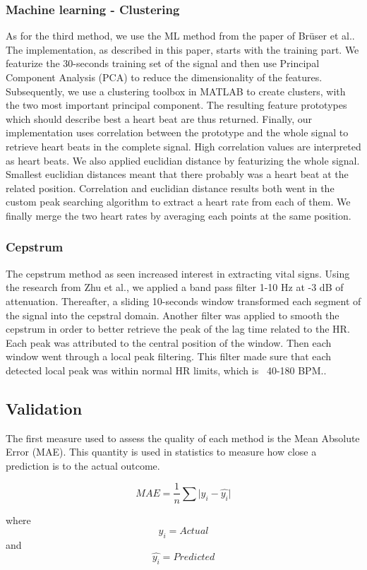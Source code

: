 \documentclass[twoside,twocolumn]{article}
\begin{document}
		\subsubsection{Machine learning - Clustering}
		As for the third method, we use the ML method from the paper of Brüser et al.\cite{bruser_adaptive_2011}. The implementation, as described in this paper, starts with the training part. We featurize the 30-seconds training set of the signal and then use Principal Component Analysis (PCA) to reduce the dimensionality of the features. Subsequently, we use a clustering toolbox in MATLAB to create clusters, with the two most important principal component. The resulting feature prototypes which should describe best a heart beat are thus returned. Finally, our implementation uses correlation between the prototype and the whole signal to retrieve heart beats in the complete signal. High correlation values are interpreted as heart beats. We also applied euclidian distance by featurizing the whole signal. Smallest euclidian distances meant that there probably was a heart beat at the related position. Correlation and euclidian distance results both went in the custom peak searching algorithm to extract a heart rate from each of them. We finally merge the two heart rates by averaging each points at the same position.
		\subsubsection{Cepstrum}
		The cepstrum method as seen increased interest in extracting vital signs. Using the research from Zhu et al.\cite{zhu_heart_2014}, we applied a band pass filter 1-10 Hz at -3 dB of attenuation. Thereafter, a sliding 10-seconds window transformed each segment of the signal into the cepstral domain. Another filter was applied to smooth the cepstrum in order to better retrieve the peak of the lag time related to the HR. Each peak was attributed to the central position of the window. Then each window went through a local peak filtering. This filter made sure that each detected local peak was within normal HR limits, which is ~40-180 BPM.\cite{zhu_heart_2014}.
	\subsection{Validation}
	\label{subsection:Methodology:Validation}
	The first measure used to assess the quality of each method is the Mean Absolute Error (MAE). This quantity is used in statistics to measure how close a prediction is to the actual outcome.
	\begin{center}
		\[MAE = \frac{1}{n}\sum\vert y_{i} - \widehat{y_{i}}\vert \] 
	\end{center}
	where 
	\[y_{i} = Actual \]
	and
	\[\widehat{y_{i}} = Predicted \]
	
\end{document}
